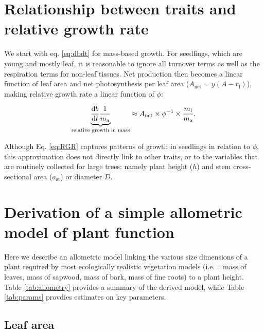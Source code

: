 \documentclass[12pt, a4paper]{article}
\begin{document}
\clearpage

\begin{appendices}
\setcounter{figure}{0} \renewcommand{\thefigure}{S\arabic{figure}}
\setcounter{table}{0} \renewcommand{\thetable}{S\arabic{table}}

\section{Relationship between traits and relative growth rate} \label{app:traits-RGR}

We start with eq. \ref{eq:dbdt} for mass-based growth. For seedlings, which are
young and mostly leaf, it is reasonable to ignore all turnover terms as
well as the respiration terms for non-leaf tissues. Net production then
becomes a linear function of leaf area and net photosynthesis per leaf
area ($A_\textrm{net} = y(A - r_\textrm{l})$), making relative growth
rate a linear function of $\phi$:

\begin{equation}\label{eq:RGR}
\underbrace{\strut\frac{\textrm{d}b}{\textrm{d}t}\frac{1}{m_\textrm{a}}}_\textrm{relative growth in mass}  \approx A_\textrm{net} \times \phi^{-1} \times \frac{m_\textrm{l}}{m_\textrm{a}}. \end{equation}

Although Eq. \ref{eq:RGR} captures patterns of growth in seedlings in
relation to $\phi$\citep{wright_cross-2000}, this
approximation does not directly link to other traits, or to the
variables that are routinely collected for large trees: namely plant
height ($h$) and stem cross-sectional area ($a_\textrm{st}$) or
diameter $D$.


\section{Derivation of a simple allometric model of plant
function}\label{app:func_balance}

Here we describe an allometric model linking the various size dimensions
of a plant required by most ecologically realistic vegetation models
(i.e. =mass of leaves, mass of sapwood, mass of bark, mass of fine
roots) to a plant height. Table \ref{tab:allometry} provides a summary
of the derived model, while Table \ref{tab:params} provdies estimates on
key parameters.


\subsection{Leaf area}\label{leaf-area}


\end{appendices}
\end{document}
